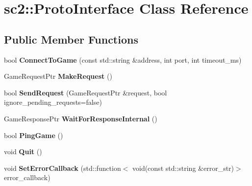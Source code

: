 \hypertarget{classsc2_1_1_proto_interface}{}\section{sc2\+:\+:Proto\+Interface Class Reference}
\label{classsc2_1_1_proto_interface}
\subsection*{Public Member Functions}
\begin{DoxyCompactItemize}
\item 
\mbox{\label{classsc2_1_1_proto_interface_a5bc1f68b90e3092b0a5ddf7c64a3c447}} 
bool {\bfseries Connect\+To\+Game} (const std\+::string \&address, int port, int timeout\+\_\+ms)
\item 
\mbox{\label{classsc2_1_1_proto_interface_a9f422cd831ab9518ee0e5c4bc291d225}} 
Game\+Request\+Ptr {\bfseries Make\+Request} ()
\item 
\mbox{\label{classsc2_1_1_proto_interface_a102c3b51d445df0aa9439f0dc75039bc}} 
bool {\bfseries Send\+Request} (Game\+Request\+Ptr \&request, bool ignore\+\_\+pending\+\_\+requests=false)
\item 
\mbox{\label{classsc2_1_1_proto_interface_a5b1bb2eb7b513dd3703d35369a67a57b}} 
Game\+Response\+Ptr {\bfseries Wait\+For\+Response\+Internal} ()
\item 
\mbox{\label{classsc2_1_1_proto_interface_a242d03e9673ac394386f28223e41fec8}} 
bool {\bfseries Ping\+Game} ()
\item 
\mbox{\label{classsc2_1_1_proto_interface_a92160bb840119a0bd033eb21ff2ad445}} 
void {\bfseries Quit} ()
\item 
\mbox{\label{classsc2_1_1_proto_interface_a03c33f48c9ef0a00f853b9f750a872a2}} 
void {\bfseries Set\+Error\+Callback} (std\+::function$<$ void(const std\+::string \&error\+\_\+str)$>$ error\+\_\+callback)
\item 
\mbox{\label{classsc2_1_1_proto_interface_a6b6cbc303c53a5b63278f4d56a85e301}} 

\end{DoxyCompactItemize}
